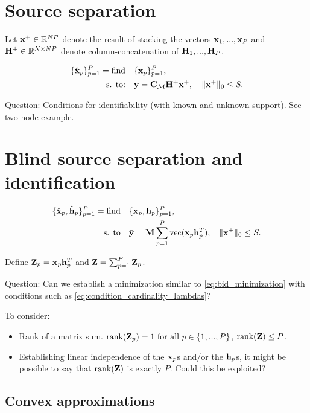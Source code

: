 \documentclass{article}
\def\x{{\mathbf x}}
\def\y{{\mathbf y}}
\def\h{{\mathbf h}}
\begin{document}
\section*{Source separation}

Let ${\mathbf x}^+ \in {\mathbb R}^{NP}$ denote the result of stacking the vectors ${\mathbf x}_1, ..., {\mathbf x}_P$ and ${\mathbf H}^+ \in {\mathbb R}^{N \times NP}$ denote column-concatenation of ${\mathbf H}_1, ..., {\mathbf H}_P$.

\begin{align}
\label{eq:ss_feasibility}
\{\hbx_p\}_{p=1}^P=\mathop{\text{find}} \quad & \{\bbx_p\}_{p=1}^P,  \\
\text{s. to:} \quad & \bar{\y} = \bbC_{\ccalM} \bbH^+ \x^+, \quad \|\x^+\|_{0}\leq S. \nonumber
\end{align}

\noindent
Question: Conditions for identifiability (with known and unknown support). See two-node example.



\section*{Blind source separation and identification}

\begin{align}
\label{eq:bss_feasibility}
   \{\hbx_p,\hbh_p\}_{p=1}^{P}=\text{find} \quad &\{\x_p,\h_p\}_{p=1}^{P}, \\
  \text{s. to} \quad & \bar{\y} = \bbM \sum_{p=1}^{P} \text{vec}(\x_p \h_p^T), \;\; \|\x^+\|_0 \leq S. \nonumber
\end{align}

\noindent
Define ${\mathbf Z}_p = {\mathbf x}_p{\mathbf h}_p^T$ and ${\mathbf Z} = \sum_{p=1}^P {\mathbf Z}_p$.

\noindent
Question: Can we establish a minimization similar to \eqref{eq:bid_minimization} with conditions such as \eqref{eq:condition_cardinality_lambdas}?

\noindent
To consider:
\begin{itemize}
  \item Rank of a matrix sum. $\text{rank}({\mathbf Z}_p)=1 \ \text{\normalfont for all} \ p \in \{1,...,P\}$, $\text{rank}({\mathbf Z}) \leq P$.
  \item Establishing linear independence of the ${\mathbf x}_p$s and/or the ${\mathbf h}_p$s, it might be possible to say that $\text{rank}({\mathbf Z})$ is exactly $P$. Could this be exploited?
\end{itemize}

\subsection*{Convex approximations}
\end{document}
